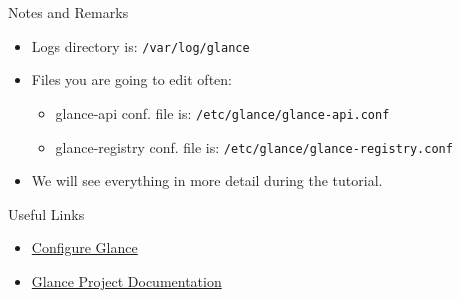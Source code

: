 \documentclass[english,serif,mathserif]{beamer}
\begin{document}
\begin{frame}{Notes and Remarks}

\begin{itemize}
\item Logs directory is: \texttt{/var/log/glance} 
\item Files you are going to edit often:
      \begin{itemize}
        \item glance-api conf. file is: \texttt{/etc/glance/glance-api.conf}
        \item glance-registry conf. file is: \texttt{/etc/glance/glance-registry.conf}
      \end{itemize}
\item We will see everything in more detail during the tutorial.
\end{itemize}

\end{frame}

\begin{frame}{Useful Links}

\begin{itemize}
\item {\color{blue}\href{http://docs.openstack.org/trunk/config-reference/content/ch\_configuring-openstack-image-service.html}{Configure Glance}}
\item {\color{blue}\href{http://docs.openstack.org/developer/glance/}{Glance Project Documentation}}
\end{itemize}

\end{frame}
\end{document}
